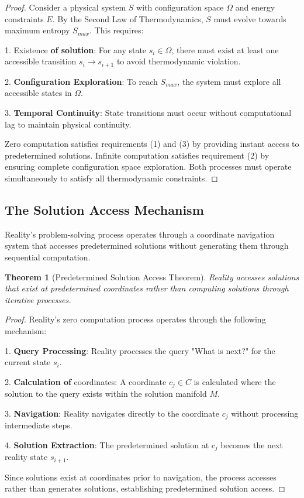 \documentclass[12pt,a4paper]{article}
\newtheorem{theorem}{Theorem}[section]
\begin{document}
\begin{proof}
Consider a physical system $S$ with configuration space $\Omega$ and energy constraints $E$. By the Second Law of Thermodynamics, $S$ must evolve towards maximum entropy $S_{max}$. This requires:

1. Existence \textbf{of solution}: For any state $s_i \in \Omega$, there must exist at least one accessible transition $s_i \rightarrow s_{i+1}$ to avoid thermodynamic violation.

2. \textbf{Configuration Exploration}: To reach $S_{max}$, the system must explore all accessible states in $\Omega$.

3. \textbf{Temporal Continuity}: State transitions must occur without computational lag to maintain physical continuity.

Zero computation satisfies requirements (1) and (3) by providing instant access to predetermined solutions. Infinite computation satisfies requirement (2) by ensuring complete configuration space exploration. Both processes must operate simultaneously to satisfy all thermodynamic constraints.
\end{proof}

\subsection{The Solution Access Mechanism}

Reality's problem-solving process operates through a coordinate navigation system that accesses predetermined solutions without generating them through sequential computation.

\begin{theorem}[Predetermined Solution Access Theorem]
Reality accesses solutions that exist at predetermined coordinates rather than computing solutions through iterative processes.
\end{theorem}

\begin{proof}
Reality's zero computation process operates through the following mechanism:

1. \textbf{Query Processing}: Reality processes the query "What is next?" for the current state $s_i$.

2. \textbf{Calculation of} coordinates: A coordinate $c_j \in C$ is calculated where the solution to the query exists within the solution manifold $M$.

3. \textbf{Navigation}: Reality navigates directly to the coordinate $c_j$ without processing intermediate steps.

4. \textbf{Solution Extraction}: The predetermined solution at $c_j$ becomes the next reality state $s_{i+1}$.

Since solutions exist at coordinates prior to navigation, the process accesses rather than generates solutions, establishing predetermined solution access.
\end{proof}
\end{document}

